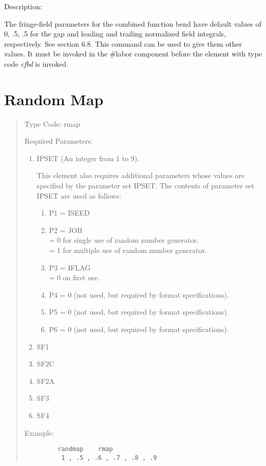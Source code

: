 \vspace{5mm}
     Description:
\vspace{2mm}

The fringe-field parameters for the combined function bend have default values of 0, .5, .5 for the gap
and leading and trailing normalized field integrals, respectively.  See
section 6.8.  This command can be used to give them other values.  It
must be invoked in the \#labor component before the element with type
code {\em cfbd} is invoked.

\newpage

\section{Random Map} 
\begin{quotation}
\noindent Type Code:  rmap
\vspace{5mm}

\noindent Required Parameters:
\begin{enumerate}
    \item  IPSET (An integer from 1 to 9).

This element also requires additional parameters whose values are
specified by the parameter set IPSET.  The contents of parameter set
IPSET are used as follows:
\begin{enumerate}
\item P1 = ISEED
\item P2 = JOB \\
         = 0 for single use of random number generator. \\
         = 1 for multiple use of random number generator.
\item P3 = IFLAG \\
         = 0 on first use.
\item P4 = 0 (not used, but required by format specifications).
\item P5 = 0 (not used, but required by format specifications).
\item P6 = 0 (not used, but required by format specifications).
\end{enumerate}
    \item  SF1
    \item  SF2C
    \item  SF2A
    \item  SF3
    \item  SF4
\end{enumerate}

\vspace{5mm}
\noindent Example:
\vspace{2mm}
\begin{verbatim}
         randmap    rmap
          1 , .5 , .6 , .7 , .8 , .9
\end{verbatim}
\end{quotation}
